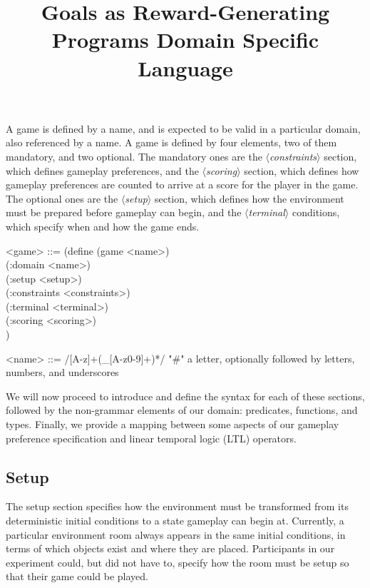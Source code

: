\documentclass{article}
\title{Goals as Reward-Generating Programs Domain Specific Language}
\newcommand{\dsl}[1]{{\it $\langle$#1$\rangle$}}
\begin{document}
\maketitle

A game is defined by a name, and is expected to be valid in a particular domain, also referenced by a name. 
A game is defined by four elements, two of them mandatory, and two optional.
The mandatory ones are the \dsl{constraints} section, which defines gameplay preferences, and the \dsl{scoring} section, which defines how gameplay preferences are counted to arrive at a score for the player in the game.
The optional ones are the \dsl{setup} section, which defines how the environment must be prepared before gameplay can begin, and the \dsl{terminal} conditions, which specify when and how the game ends. 

\begin{grammar}
<game> ::= (define (game <name>) \\
  (:domain <name>) \\
  (:setup <setup>) \\
  (:constraints <constraints>) \\
  (:terminal <terminal>) \\
  (:scoring <scoring>) \\)

<name> ::= /[A-z]+(_[A-z0-9]+)*/ "#" a letter, optionally followed by letters, numbers, and underscores
\end{grammar}

We will now proceed to introduce and define the syntax for each of these sections, followed by the non-grammar elements of our domain: predicates, functions, and types. 
Finally, we provide a mapping between some aspects of our gameplay preference specification and linear temporal logic (LTL) operators. 

\subsection{Setup} \label{sec:setup}
The setup section specifies how the environment must be transformed from its deterministic initial conditions to a state gameplay can begin at. 
Currently, a particular environment room always appears in the same initial conditions, in terms of which objects exist and where they are placed.
Participants in our experiment could, but did not have to, specify how the room must be setup so that their game could be played.
\end{document}
